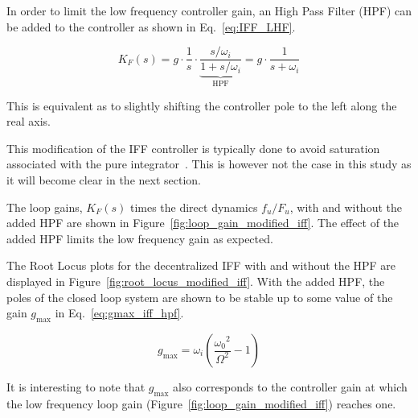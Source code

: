 \documentclass[10pt]{iopart}
\begin{document}
In order to limit the low frequency controller gain, an High Pass Filter (HPF) can be added to the controller as shown in Eq.~\eqref{eq:IFF_LHF}.

\begin{equation}
\label{eq:IFF_LHF}
  K_{F}(s) = g \cdot \frac{1}{s} \cdot \underbrace{\frac{s/\omega_i}{1 + s/\omega_i}}_{\text{HPF}} = g \cdot \frac{1}{s + \omega_i}
\end{equation}

This is equivalent as to slightly shifting the controller pole to the left along the real axis.

This modification of the IFF controller is typically done to avoid saturation associated with the pure integrator~\cite{preumont91_activ,marneffe07_activ_passiv_vibrat_isolat_dampin_shunt_trans}.
This is however not the case in this study as it will become clear in the next section.

\par
The loop gains, \(K_F(s)\) times the direct dynamics \(f_u/F_u\), with and without the added HPF are shown in Figure~\ref{fig:loop_gain_modified_iff}.
The effect of the added HPF limits the low frequency gain as expected.

The Root Locus plots for the decentralized IFF with and without the HPF are displayed in Figure~\ref{fig:root_locus_modified_iff}.
With the added HPF, the poles of the closed loop system are shown to be stable up to some value of the gain \(g_\text{max}\) in Eq.~\eqref{eq:gmax_iff_hpf}.

\begin{equation}
\label{eq:gmax_iff_hpf}
  g_{\text{max}} = \omega_i \left( \frac{{\omega_0}^2}{\Omega^2} - 1 \right)
\end{equation}

It is interesting to note that \(g_{\text{max}}\) also corresponds to the controller gain at which the low frequency loop gain (Figure~\ref{fig:loop_gain_modified_iff}) reaches one.
\end{document}
